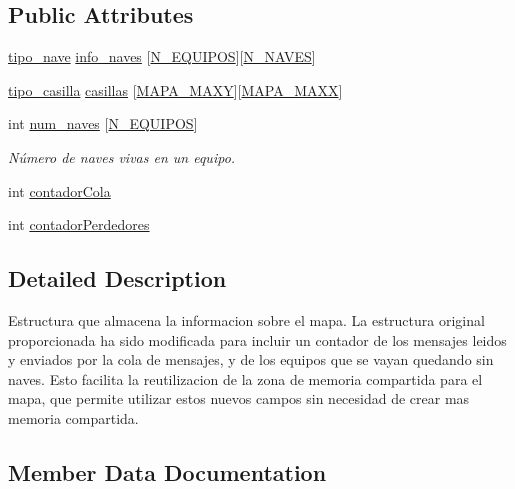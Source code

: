 \subsection*{Public Attributes}
\begin{DoxyCompactItemize}
\item 
\hyperlink{structtipo__nave}{tipo\+\_\+nave} \hyperlink{structtipo__mapa_a4796e19ff6b789ec44086b1bd662cd37}{info\+\_\+naves} \mbox{[}\hyperlink{simulador_8h_ab306668933fb4316ac0f5ef291d13dff}{N\+\_\+\+E\+Q\+U\+I\+P\+OS}\mbox{]}\mbox{[}\hyperlink{simulador_8h_aa1f2aba814c6d46772f9694849eeaa7a}{N\+\_\+\+N\+A\+V\+ES}\mbox{]}
\item 
\hyperlink{structtipo__casilla}{tipo\+\_\+casilla} \hyperlink{structtipo__mapa_a9fbe4aea60d084542050976284c2ea36}{casillas} \mbox{[}\hyperlink{simulador_8h_a5ae04aabcd69e10042a64a5dcf9a959d}{M\+A\+P\+A\+\_\+\+M\+A\+XY}\mbox{]}\mbox{[}\hyperlink{simulador_8h_ab55303c06ac5e3f77559983df0288e73}{M\+A\+P\+A\+\_\+\+M\+A\+XX}\mbox{]}
\item 
int \hyperlink{structtipo__mapa_a5a59bf5262122191c18e3a94eae24a8c}{num\+\_\+naves} \mbox{[}\hyperlink{simulador_8h_ab306668933fb4316ac0f5ef291d13dff}{N\+\_\+\+E\+Q\+U\+I\+P\+OS}\mbox{]}
\begin{DoxyCompactList}\small\item\em Número de naves vivas en un equipo. \end{DoxyCompactList}\item 
int \hyperlink{structtipo__mapa_a7f9e90d387d66f389630d65851398308}{contador\+Cola}
\item 
int \hyperlink{structtipo__mapa_a6cb20251f08713a0f1c08da2216d16e1}{contador\+Perdedores}
\end{DoxyCompactItemize}


\subsection{Detailed Description}
Estructura que almacena la informacion sobre el mapa. La estructura original proporcionada ha sido modificada para incluir un contador de los mensajes leidos y enviados por la cola de mensajes, y de los equipos que se vayan quedando sin naves. Esto facilita la reutilizacion de la zona de memoria compartida para el mapa, que permite utilizar estos nuevos campos sin necesidad de crear mas memoria compartida. 

\subsection{Member Data Documentation}
\mbox{\label{structtipo__mapa_a9fbe4aea60d084542050976284c2ea36}} 
